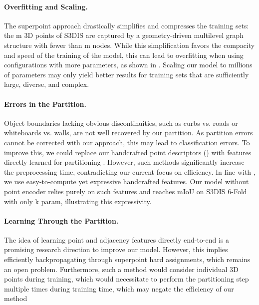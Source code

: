 \paragraph{Overfitting and Scaling.} The superpoint approach drastically simplifies and compresses the training sets: the m 3D points of S3DIS are captured by a geometry-driven multilevel graph structure with fewer than m nodes.
While this simplification favors the compacity and speed of the training of the model, this can lead to overfitting when using \SHORTHAND configurations with more parameters, as shown in .
Scaling our model to millions of parameters may only yield better results for training sets that are sufficiently large, diverse, and complex.

\paragraph{Errors in the Partition.} Object boundaries lacking obvious discontinuities, such as curbs vs. roads or whiteboards vs. walls, are not well recovered by our partition. As partition errors cannot be corrected with our approach, this may lead to classification errors.
To improve this, we could replace our handcrafted point descriptors () with features directly learned for partitioning \cite{landrieu2019point,hui2021superpoint}.
However, such methods significantly increase the preprocessing time, contradicting our current focus on efficiency.
In line with \cite{hsu2020incorporating,ran2022surface}, we use easy-to-compute yet expressive handcrafted features. 
Our model \SHORTHANDNANO without point encoder relies purely on such features and reaches  mIoU on S3DIS 6-Fold with only k param, illustrating this expressivity.

\paragraph{Learning Through the Partition.} The idea of learning point and adjacency features directly end-to-end is a promising research direction to improve our model. However, this implies efficiently backpropagating through superpoint hard assignments, which remains an open problem. Furthermore, such a method would consider individual 3D points during training, which would necessitate to perform the partitioning step multiple times during training time, which may negate the efficiency of our method

